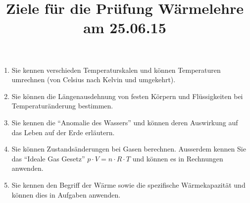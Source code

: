 \documentclass[12pt,a5paper,twoside]{article}
\title{Ziele für die Prüfung Wärmelehre am 25.06.15}
\date{}
\begin{document}
\maketitle


\begin{enumerate}
	\item Sie kennen verschieden Temperaturskalen und können Temperaturen umrechnen (von Celsius nach Kelvin und umgekehrt).
	\item Sie können die Längenausdehnung von festen Körpern und Flüssigkeiten bei Temperaturänderung bestimmen.
	\item Sie kennen die ``Anomalie des Wassers'' und können deren Auswirkung auf das Leben auf der Erde erläutern.
	\item Sie können Zustandsänderungen bei Gasen berechnen. Ausserdem kennen Sie das ``Ideale Gas Gesetz'' $p\cdot V = n\cdot R \cdot T$
		und können es in Rechnungen anwenden.
	\item Sie kennen den Begriff der Wärme sowie die spezifische Wärmekapazität und können dies in Aufgaben anwenden.

\end{enumerate}
\end{document}
